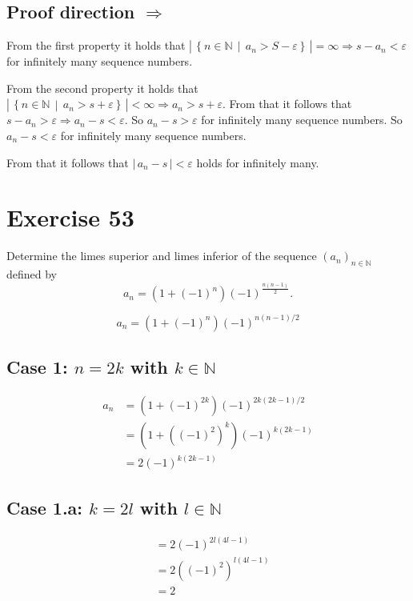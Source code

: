 \documentclass[a4paper]{article}
\theoremstyle{definition}
\newcommand\setdef[2]{\left\{#1\,\middle|\,#2\right\}}
\newcommand\card[1]{\left|\,#1\,\right|}
\newcommand\seq[1]{\left(#1\right)_{n\in\mathbb N}}
\begin{document}
\subsection{Proof direction $\Rightarrow$}

From the first property it holds that
$\card{\setdef{n \in \mathbb N}{a_n > S - \varepsilon}} = \infty \Rightarrow s - a_n < \varepsilon$
for infinitely many sequence numbers.

From the second property it holds that
$\card{\setdef{n \in \mathbb N}{a_n > s + \varepsilon}} < \infty \Rightarrow a_n > s + \varepsilon$.
From that it follows that $s - a_n > \varepsilon \Rightarrow a_n - s < \varepsilon$.
So $a_n - s > \varepsilon$ for infinitely many sequence numbers.
So $a_n - s < \varepsilon$ for infinitely many sequence numbers.

From that it follows that $\card{a_n - s} < \varepsilon$ holds for infinitely many.

\section{Exercise 53}
\begin{ex}
  Determine the limes superior and limes inferior of the sequence $\seq{a_n}$
  defined by
  \[ a_n = \left(1 + (-1)^n\right) (-1)^{\frac{n (n-1)}{2}}. \]
\end{ex}

\[ a_n = (1 + (-1)^n) (-1)^{n(n-1)/2} \]

\subsection{Case 1: $n = 2k$ with $k \in \mathbb N$}
%
\begin{align*}
  a_n &= \left(1 + (-1)^{2k}\right) (-1)^{2k (2k - 1) / 2} \\
    &= \left(1 + \left((-1)^2\right)^k\right) (-1)^{k (2k - 1)} \\
    &= 2 (-1)^{k (2k - 1)}
\end{align*}

\subsection{Case 1.a: $k = 2l$ with $l \in \mathbb N$}
%
\begin{align*}
    &= 2 (-1)^{2l (4l - 1)} \\
    &= 2 \left((-1)^2\right)^{l (4l - 1)} \\
    &= 2
\end{align*}
\end{document}
